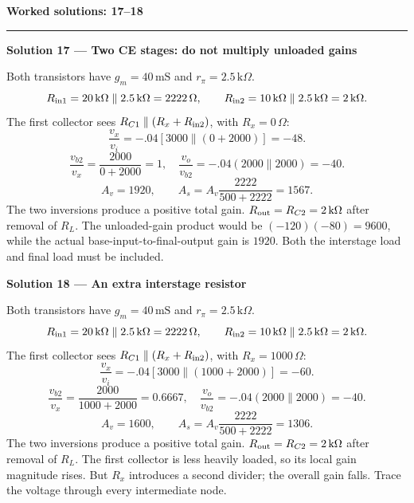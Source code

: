 \documentclass[11pt,a4paper]{article}
\newcommand{\K}{\,\mathrm{k}\Omega}\newcommand{\Oh}{\,\Omega}\newcommand{\mS}{\,\mathrm{mS}}
\newcommand{\head}[1]{\par{\Large\bfseries\color{ink}#1}\par\vspace{3pt}\hrule\vspace{7pt}}
\newcommand{\sol}[2]{\par{\large\bfseries\color{ink}Solution #1 --- #2}\label{sol:#1}\par}
\begin{document}
\newpage
\head{Worked solutions: 17--18}
\sol{17}{Two CE stages: do not multiply unloaded gains}Both transistors have $g_m=40\mS$ and $r_\pi=2.5\K$.
\[R_{\rm in1}=20\K\parallel2.5\K=2222\Oh,\qquad R_{\rm in2}=10\K\parallel2.5\K=2\K.\]
The first collector sees $R_{C1}\parallel(R_x+R_{\rm in2})$, with $R_x=0\Oh$:
\[\frac{v_x}{v_i}=-.04[3000\parallel(0+2000)]=-48.\]
\[\frac{v_{b2}}{v_x}=\frac{2000}{0+2000}=1,\quad
\frac{v_o}{v_{b2}}=-.04(2000\parallel2000)=-40.\]
\[A_v=1920,\qquad A_s=A_v\frac{2222}{500+2222}=1567.\]
The two inversions produce a positive total gain. $R_{\rm out}=R_{C2}=2\K$ after removal of $R_L$. The unloaded-gain product would be $(-120)(-80)=9600$, while the actual base-input-to-final-output gain is $1920$. Both the interstage load and final load must be included.\par\vfill
\sol{18}{An extra interstage resistor}Both transistors have $g_m=40\mS$ and $r_\pi=2.5\K$.
\[R_{\rm in1}=20\K\parallel2.5\K=2222\Oh,\qquad R_{\rm in2}=10\K\parallel2.5\K=2\K.\]
The first collector sees $R_{C1}\parallel(R_x+R_{\rm in2})$, with $R_x=1000\Oh$:
\[\frac{v_x}{v_i}=-.04[3000\parallel(1000+2000)]=-60.\]
\[\frac{v_{b2}}{v_x}=\frac{2000}{1000+2000}=0.6667,\quad
\frac{v_o}{v_{b2}}=-.04(2000\parallel2000)=-40.\]
\[A_v=1600,\qquad A_s=A_v\frac{2222}{500+2222}=1306.\]
The two inversions produce a positive total gain. $R_{\rm out}=R_{C2}=2\K$ after removal of $R_L$. The first collector is less heavily loaded, so its local gain magnitude rises. But $R_x$ introduces a second divider; the overall gain falls. Trace the voltage through every intermediate node.\par\vfill
\end{document}
